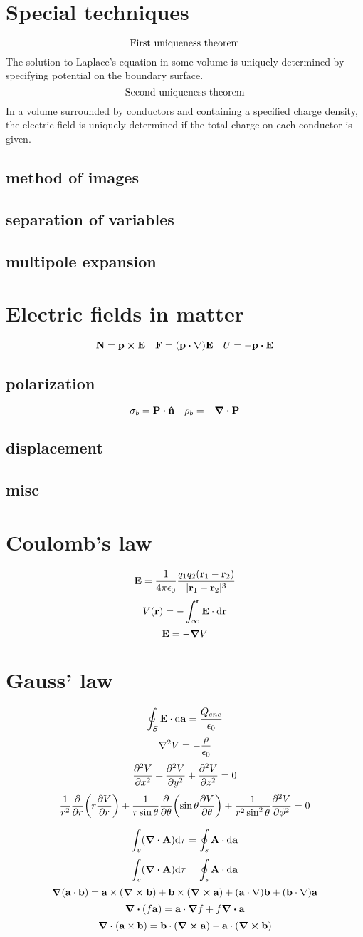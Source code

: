 \documentclass[12pt]{article}
\begin{document}
\section{Special techniques}
\[\qq{First uniqueness theorem}\]
The solution to Laplace's equation in some volume is uniquely determined by specifying potential on the boundary surface.
\[\qq{Second uniqueness theorem}\]
In a volume surrounded by conductors and containing a specified charge density, the electric field is uniquely determined if the total charge on each conductor is given.
\subsection*{method of images}
\subsection*{separation of variables}
\subsection*{multipole expansion}
\section{Electric fields in matter}
\[\vb{N}=\vb{p}\cp\vb{E}\quad\vb{F}=\qty(\vb{p}\vdot\nabla)\vb{E}\quad U=-\vb{p}\vdot\vb{E}\]
\subsection*{polarization}
\[\sigma_b=\vb{P}\vdot\vu{n}\quad\rho_b=-\div{\vb{P}}\]
\subsection*{displacement}

\subsection*{misc}
\section*{Coulomb's law}
\[\vb{E}=\frac{1}{4\pi\epsilon_0}\frac{q_1q_2(\vb{r}_1-\vb{r}_2)}{|\vb{r}_1-\vb{r}_2|^3}\]
\[V(\vb{r})=-\int_\infty^{\vb{r}}\vb{E}\cdot\dd\vb{r}\]
\[\vb{E}=-\grad{V}\]
\section*{Gauss' law}
\[\oint_S{\vb{E}\cdot\dd{\vb{a}}}=\frac{Q_{enc}}{\epsilon_0}\]
\[\laplacian{V}=-\frac{\rho}{\epsilon_0}\]
\[\pdv[2]{V}{x}+\pdv[2]{V}{y}+\pdv[2]{V}{z}=0\]
\[\frac{1}{r^2}\pdv{r}\qty(r\pdv{V}{r})+\frac{1}{r\sin\theta}\pdv{\theta}\qty(\sin\theta\pdv{V}{\theta})+\frac{1}{r^2\sin^2\theta}\pdv[2]{V}{\phi}=0\]

\[\int_{v}(\div{\vb{A}})\dd\tau=\oint_{s}\vb{A}\cdot\dd{\vb{a}}\]
\[\int_{v}(\div{\vb{A}})\dd\tau=\oint_{s}\vb{A}\cdot\dd{\vb{a}}\]
\[\grad{(\vb{a}\cdot\vb{b})}=\vb{a}\times(\curl{\vb{b}})+\vb{b}\times(\curl{\vb{a}})+(\vb{a}\cdot\nabla)\vb{b}+(\vb{b}\cdot\nabla)\vb{a}\]
\[\div{(f\vb{a})}=\vb{a}\cdot\grad{f}+f\div{\vb{a}}\]
\[\div{(\vb{a}\times\vb{b})}=\vb{b}\cdot(\curl{\vb{a}})-\vb{a}\cdot(\curl{\vb{b}})\]
\end{document}
